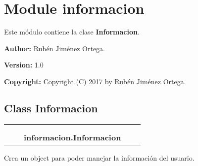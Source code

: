 %
%
%


\section{Module informacion}

    \label{informacion}
Este módulo contiene la clase \textbf{Informacion}.

\textbf{Author:} Rubén Jiménez Ortega.



\textbf{Version:} 1.0



\textbf{Copyright:} Copyright (C) 2017 by Rubén Jiménez Ortega.





\subsection{Class Informacion}

    \label{informacion:Informacion}
\begin{tabular}{cccccc}
\multicolumn{2}{r}{\settowidth{\BCL}{object}\multirow{2}{\BCL}{object}}
&&
  \\\cline{3-3}
  &&\multicolumn{1}{c|}{}
&&
  \\
&&\multicolumn{2}{l}{\textbf{informacion.Informacion}}
\end{tabular}

Crea un object para poder manejar la información del usuario.



